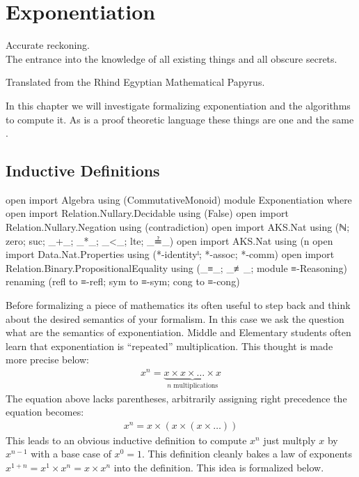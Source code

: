 \documentclass[./Thesis.tex]{subfiles}
\begin{document}
\chapter{Exponentiation}
\label{chap:exponentiation}

\epigraph{
  Accurate reckoning. \\
  The entrance into the knowledge of all existing
  things and all obscure secrets.
}{
  Translated from the Rhind Egyptian Mathematical Papyrus.
  \cite{rhind-papyrus}
}

In this chapter we will investigate formalizing exponentiation and the
algorithms to compute it. As \Agda{} is a proof theoretic language these things
are one and the same \cite{hott-book}.

\section{Inductive Definitions}
\label{sec:inductive-definitions}

\begin{code}[hide]
  open import Algebra using (CommutativeMonoid)
  module Exponentiation where
  open import Relation.Nullary.Decidable using (False)
  open import Relation.Nullary.Negation using (contradiction)
  open import AKS.Nat using (ℕ; zero; suc; _+_; _*_; _<_; lte; _≟_)
  open import AKS.Nat using (n%
  open import Data.Nat.Properties using (*-identityˡ; *-assoc; *-comm)
  open import Relation.Binary.PropositionalEquality using (_≡_; _≢_; module ≡-Reasoning) renaming (refl to ≡-refl; sym to ≡-sym; cong to ≡-cong)
\end{code}

Before formalizing a piece of mathematics its often useful to step
back and think about the desired semantics of your formalism. In this case we
ask the question what are the semantics of exponentiation. Middle and Elementary
students often learn that exponentiation is ``repeated'' multiplication. This
thought is made more precise below:
\begin{align}
  \label{eqn:exp-first-idea}
  x^n = \underbrace{x \times x \times \dots \times x}_{n \text{ multiplications}}
\end{align}
The equation above lacks parentheses, arbitrarily assigning right precedence
the equation becomes:
\begin{align}
  \label{eqn:exp-second-idea}
  x^n = x \times (x \times (x \times \dots))
\end{align}
This leads to an obvious inductive definition to compute $x^n$ just multply $x$
by $x^{n -1}$ with a base case of $x^0 = 1$. This definition cleanly bakes a law
of exponents $x^{1+n} = x^1 \times x^n = x \times x^n$ into the definition. This
idea is formalized below. \\
\end{document}

